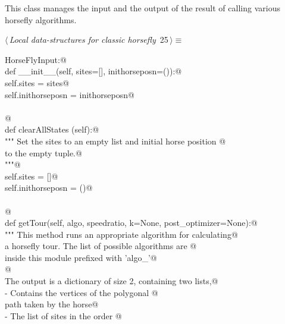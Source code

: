 \documentclass[11.5pt]{report}
\begin{document}
\newchunk This class manages the input and the output of the result of 
calling various horsefly algorithms. 

\begin{flushleft} \small\label{scrap18}\raggedright\small
{} $\langle\,${\itshape Local data-structures for classic horsefly}\nobreak\ {\footnotesize {25}}$\,\rangle\equiv$
\vspace{-1ex}
\begin{list}{}{} \item
\mbox{}\verb@class HorseFlyInput:@\\
\mbox{}\verb@      def __init__(self, sites=[], inithorseposn=()):@\\
\mbox{}\verb@           self.sites         = sites@\\
\mbox{}\verb@           self.inithorseposn = inithorseposn@\\
\mbox{}\verb@@\\
\mbox{}\verb@           @\\
\mbox{}\verb@      def clearAllStates (self):@\\
\mbox{}\verb@          """ Set the sites to an empty list and initial horse position @\\
\mbox{}\verb@          to the empty tuple.@\\
\mbox{}\verb@          """@\\
\mbox{}\verb@          self.sites = []@\\
\mbox{}\verb@          self.inithorseposn = ()@\\
\mbox{}\verb@@\\
\mbox{}\verb@          @\\
\mbox{}\verb@      def getTour(self, algo, speedratio, k=None, post_optimizer=None):@\\
\mbox{}\verb@          """ This method runs an appropriate algorithm for calculating@\\
\mbox{}\verb@          a horsefly tour. The list of possible algorithms are @\\
\mbox{}\verb@          inside this module prefixed with 'algo_'@\\
\mbox{}\verb@          @\\
\mbox{}\verb@          The output is a dictionary of size 2, containing two lists,@\\
\mbox{}\verb@          - Contains the vertices of the polygonal @\\
\mbox{}\verb@            path taken by the horse@\\
\mbox{}\verb@          - The list of sites in the order @\\

\end{list}
\end{flushleft}
\end{document}
